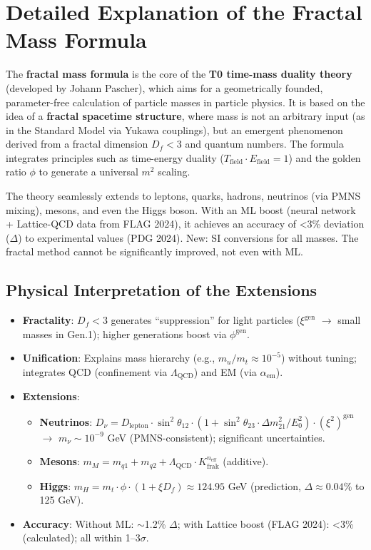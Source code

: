	\section{Detailed Explanation of the Fractal Mass Formula}
	
	The \textbf{fractal mass formula} is the core of the \textbf{T0 time-mass duality theory} (developed by Johann Pascher), which aims for a geometrically founded, parameter-free calculation of particle masses in particle physics. It is based on the idea of a \textbf{fractal spacetime structure}, where mass is not an arbitrary input (as in the Standard Model via Yukawa couplings), but an emergent phenomenon derived from a fractal dimension $D_f < 3$ and quantum numbers. The formula integrates principles such as time-energy duality ($T_{\text{field}} \cdot E_{\text{field}} = 1$) and the golden ratio $\phi$ to generate a universal $m^2$ scaling.
	
	The theory seamlessly extends to leptons, quarks, hadrons, neutrinos (via PMNS mixing), mesons, and even the Higgs boson. With an ML boost (neural network + Lattice-QCD data from FLAG 2024), it achieves an accuracy of <3\% deviation ($\Delta$) to experimental values (PDG 2024). New: SI conversions for all masses. The fractal method cannot be significantly improved, not even with ML.
	
	\subsection{Physical Interpretation of the Extensions}
	\begin{itemize}
		\item \textbf{Fractality}: $D_f < 3$ generates ``suppression'' for light particles ($\xi^{\text{gen}}$ $\rightarrow$ small masses in Gen.1); higher generations boost via $\phi^{\text{gen}}$.
		\item \textbf{Unification}: Explains mass hierarchy (e.g., $m_u / m_t \approx 10^{-5}$) without tuning; integrates QCD (confinement via $\Lambda_{\text{QCD}}$) and EM (via $\alpha_{\text{em}}$).
		\item \textbf{Extensions}:
		\begin{itemize}
			\item \textbf{Neutrinos}: $D_\nu = D_{\text{lepton}} \cdot \sin^2 \theta_{12} \cdot (1 + \sin^2 \theta_{23} \cdot \Delta m^2_{21}/E_0^2) \cdot (\xi^2)^{\text{gen}}$ $\rightarrow$ $m_\nu \sim 10^{-9}$ GeV (PMNS-consistent); significant uncertainties.
			\item \textbf{Mesons}: $m_M = m_{q1} + m_{q2} + \Lambda_{\text{QCD}} \cdot K_{\text{frak}}^{n_{\text{eff}}}$ (additive).
			\item \textbf{Higgs}: $m_H = m_t \cdot \phi \cdot (1 + \xi D_f) \approx 124.95$ GeV (prediction, $\Delta \approx 0.04\%$ to 125 GeV).
		\end{itemize}
		\item \textbf{Accuracy}: Without ML: $\sim$1.2\% $\Delta$; with Lattice boost (FLAG 2024): <3\% (calculated); all within 1--3$\sigma$.
	\end{itemize}
	

